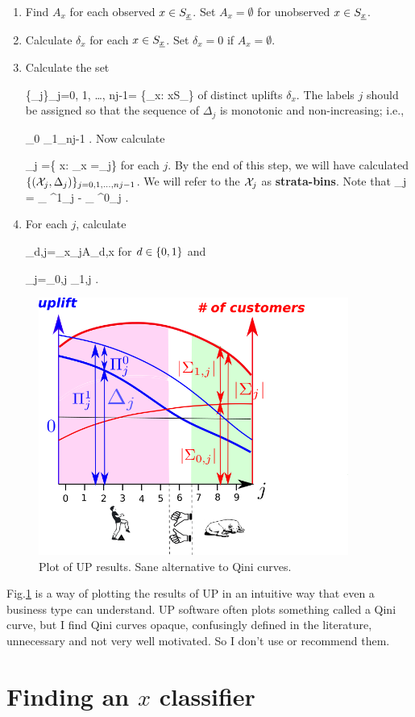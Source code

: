 \begin{enumerate}
\item Find $A_x$ 
for each observed $x\in S_{\underline{x}}$.
Set $A_x=\emptyset$ for unobserved $x\in S_{\underline{x}}$.
 
\item Calculate $\delta_x$
for each $x\in S_{\underline{x}}$.
Set $\delta_x=0$ if $A_x=\emptyset$.

\item Calculate
the set 

\beq\{\Delta_j\}_{j=0, 1, \ldots, nj-1}=
\{\delta_x: x\in S_\rvx\}
\eeq
of distinct uplifts $\delta_x$.
The labels 
$j$ should be assigned
so that the sequence of
$\Delta_j$
is monotonic and non-increasing; i.e.,

\beq
\Delta_0 \geq \Delta_{1}\geq\cdots \geq \Delta_{nj-1}
\;.
\eeq
Now calculate 

\beq
\calx_j =\{ x: \delta_x =\Delta_j\}
\eeq
 for each $j$.
By the end of this step,
we will have calculated 
$\{({\cal X}_j, \Delta_j)\}_{j=0,1, \ldots, nj-1}$.
We will refer to the ${\cal X}_j$
as {\bf strata-bins}. Note that
\beq
\Delta_j = 
_
{\displaystyle \Pi^1_j}
- 
_
{\displaystyle \Pi^0_j}
\;.
\eeq
\item
For each $j$,
calculate 

\beq
\Sigma_{d,j}=\cup_{x\in \calx_j}A_{d,x}
\eeq
for $d\in\{0,1\}$
and 

\beq
\Sigma_{j}=\Sigma_{0,j}
\cup \Sigma_{1,j}
\;.
\eeq
\end{enumerate}


\begin{figure}[h!]
\centering
\includegraphics[width=4in]
{uplift/qini-fake.png}

\caption{
Plot
of UP results.
Sane alternative to Qini curves.
} 
\label{fig-qini-fake}
\end{figure}
Fig.\ref{fig-qini-fake}
is a  way of
plotting
the results 
of UP in an
intuitive
way
that even a
business type can understand.
UP software
often plots something
called a Qini
curve, 
but I find Qini
curves opaque, confusingly defined 
in the literature, unnecessary
and 
not very well motivated. So I don't
use or recommend them.




\section{Finding 
an $x$ classifier}
